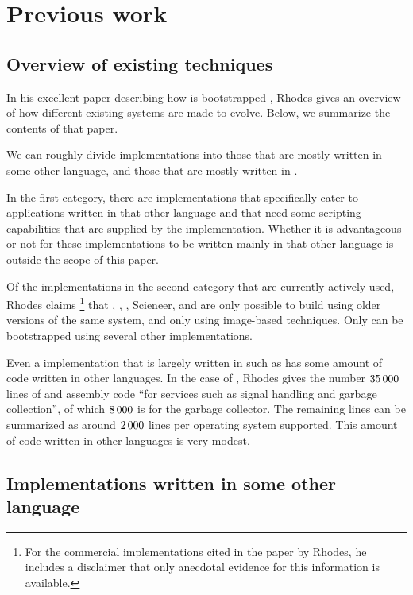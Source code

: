 \section{Previous work}

\subsection{Overview of existing techniques}

In his excellent paper describing how \sbcl{} is bootstrapped
\cite{Rhodes:2008:SSC:1482373.1482380}, Rhodes gives an overview of
how different existing \commonlisp{} systems are made to evolve.
Below, we summarize the contents of that paper.

We can roughly divide \commonlisp{} implementations into those that
are mostly written in some other language, and those that are mostly
written in \commonlisp{}.

In the first category, there are implementations that specifically
cater to applications written in that other language and that need
some scripting capabilities that are supplied by the \commonlisp{}
implementation.  Whether it is advantageous or not for these
implementations to be written mainly in that other language is outside
the scope of this paper.

Of the implementations in the second category that are currently
actively used, Rhodes claims%
\footnote{For the commercial \commonlisp{} implementations cited in
  the paper by Rhodes, he includes a disclaimer that only anecdotal
  evidence for this information is available.}
that \allegro{}, \lispworks{}, \cmucl{}, Scieneer, and \ccl{} are only
possible to build using older versions of the same system, and only
using image-based techniques.  Only \sbcl{} can be bootstrapped using
several other \commonlisp{} implementations.

Even a \commonlisp{} implementation that is largely written in
\commonlisp{} such as \sbcl{} has some amount of code written in other
languages.  In the case of \sbcl{}, Rhodes gives the number
$35\thinspace000$ lines of \clanguage{} and assembly code ``for
services such as signal handling and garbage collection'', of which
$8\thinspace000$ is for the garbage collector.  The remaining lines
can be summarized as around $2\thinspace000$ lines per operating
system supported.  This amount of code written in other languages is
very modest.

\subsection{Implementations written in some other language}

